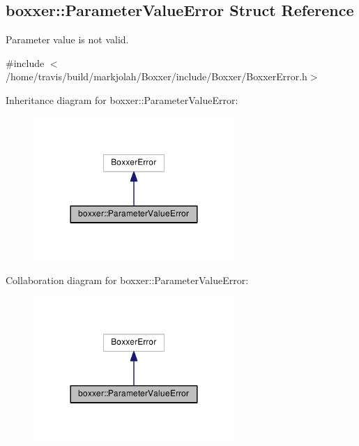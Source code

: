 \hypertarget{structboxxer_1_1ParameterValueError}{}\subsection{boxxer\+:\+:Parameter\+Value\+Error Struct Reference}
\label{structboxxer_1_1ParameterValueError}


Parameter value is not valid.  




{\ttfamily \#include $<$/home/travis/build/markjolah/\+Boxxer/include/\+Boxxer/\+Boxxer\+Error.\+h$>$}



Inheritance diagram for boxxer\+:\+:Parameter\+Value\+Error\+:\nopagebreak
\begin{figure}[H]
\begin{center}
\leavevmode
\includegraphics[width=216pt]{structboxxer_1_1ParameterValueError__inherit__graph}
\end{center}
\end{figure}


Collaboration diagram for boxxer\+:\+:Parameter\+Value\+Error\+:\nopagebreak
\begin{figure}[H]
\begin{center}
\leavevmode
\includegraphics[width=216pt]{structboxxer_1_1ParameterValueError__coll__graph}
\end{center}
\end{figure}
